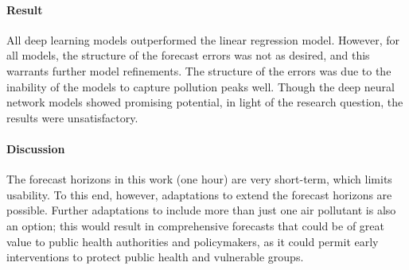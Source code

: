 \paragraph{Result}
All deep learning models outperformed the linear regression model. However, for all models, the structure of the forecast errors was not as desired, and this warrants further model refinements. The structure of the errors was due to the inability of the models to capture pollution peaks well. Though the deep neural network models showed promising potential, in light of the research question, the results were unsatisfactory. 

\paragraph{Discussion}
The forecast horizons in this work (one hour) are very short-term, which limits usability. To this end, however, adaptations to extend the forecast horizons are possible. Further adaptations to include more than just one air pollutant is also an option; this would result in comprehensive forecasts that could be of great value to public health authorities and policymakers, as it could permit early interventions to protect public health and vulnerable groups.
